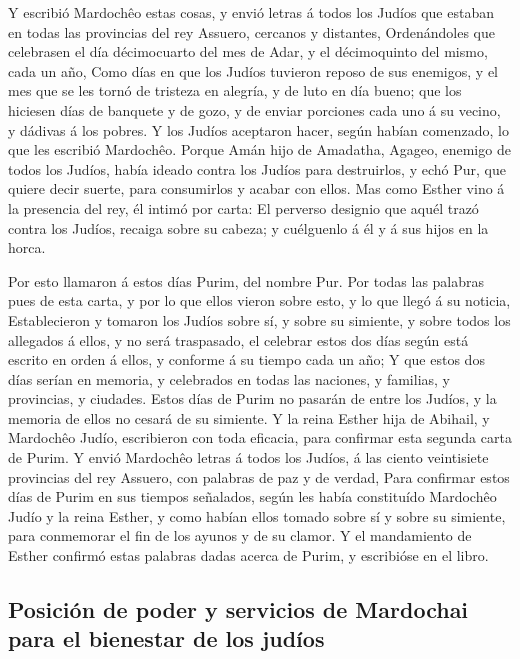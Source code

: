  Y escribió Mardochêo estas cosas, y envió letras á todos
los Judíos que estaban en todas las provincias del rey Assuero, cercanos
y distantes,  Ordenándoles que celebrasen el día
décimocuarto del mes de Adar, y el décimoquinto del mismo, cada un año,
 Como días en que los Judíos tuvieron reposo de sus
enemigos, y el mes que se les tornó de tristeza en alegría, y de luto en
día bueno; que los hiciesen días de banquete y de gozo, y de enviar
porciones cada uno á su vecino, y dádivas á los pobres. 
Y los Judíos aceptaron hacer, según habían comenzado, lo que les
escribió Mardochêo.  Porque Amán hijo de Amadatha,
Agageo, enemigo de todos los Judíos, había ideado contra los Judíos para
destruirlos, y echó Pur, que quiere decir suerte, para consumirlos y
acabar con ellos.  Mas como Esther vino á la presencia
del rey, él intimó por carta: El perverso designio que aquél trazó
contra los Judíos, recaiga sobre su cabeza; y cuélguenlo á él y á sus
hijos en la horca.

 Por esto llamaron á estos días Purim, del nombre Pur.
Por todas las palabras pues de esta carta, y por lo que ellos vieron
sobre esto, y lo que llegó á su noticia,  Establecieron y
tomaron los Judíos sobre sí, y sobre su simiente, y sobre todos los
allegados á ellos, y no será traspasado, el celebrar estos dos días
según está escrito en orden á ellos, y conforme á su tiempo cada un año;
 Y que estos dos días serían en memoria, y celebrados en
todas las naciones, y familias, y provincias, y ciudades. Estos días de
Purim no pasarán de entre los Judíos, y la memoria de ellos no cesará de
su simiente.  Y la reina Esther hija de Abihail, y
Mardochêo Judío, escribieron con toda eficacia, para confirmar esta
segunda carta de Purim.  Y envió Mardochêo letras á todos
los Judíos, á las ciento veintisiete provincias del rey Assuero, con
palabras de paz y de verdad,  Para confirmar estos días
de Purim en sus tiempos señalados, según les había constituído Mardochêo
Judío y la reina Esther, y como habían ellos tomado sobre sí y sobre su
simiente, para conmemorar el fin de los ayunos y de su clamor.
 Y el mandamiento de Esther confirmó estas palabras dadas
acerca de Purim, y escribióse en el libro.

\hypertarget{posiciuxf3n-de-poder-y-servicios-de-mardochai-para-el-bienestar-de-los-juduxedos}{%
\subsection{Posición de poder y servicios de Mardochai para el bienestar
de los
judíos}\label{posiciuxf3n-de-poder-y-servicios-de-mardochai-para-el-bienestar-de-los-juduxedos}}

